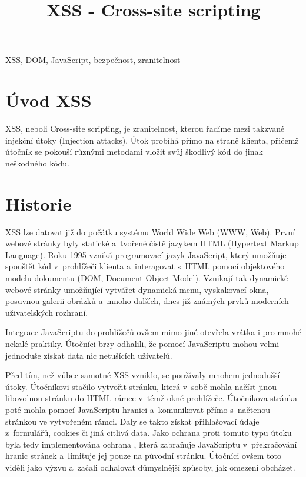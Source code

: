 \documentclass[11pt,conference, a4paper]{IEEEtran}
\begin{document}
\title{XSS \-- Cross\--site scripting}

\author{
}
\maketitle

\begin{abstract}

\end{abstract}

\begin{IEEEkeywords}
XSS, DOM, JavaScript, bezpečnost, zranitelnost
\end{IEEEkeywords}

\section{Úvod XSS}
XSS, neboli Cross-site scripting, je zranitelnost, kterou řadíme mezi takzvané injekční útoky (Injection attacks). Útok probíhá přímo na straně klienta, přičemž útočník se pokouší různými metodami vložit svůj škodlivý kód do jinak neškodného kódu.



\section{Historie}
XSS lze datovat již do počátku systému World Wide Web (WWW, Web). První webové stránky byly statické a~tvořené čistě jazykem HTML (Hypertext Markup Language). Roku 1995 vzniká programovací jazyk JavaScript, který umožňuje spouštět kód v~prohlížeči klienta a~interagovat s~HTML pomocí objektového modelu dokumentu (DOM,  Document Object Model). Vznikají tak dynamické webové stránky umožňující vytvářet dynamická menu, vyskakovací okna, posuvnou galerii obrázků a~mnoho dalších, dnes již známých prvků moderních uživatelských rozhraní. 

Integrace JavaScriptu do prohlížečů ovšem mimo jiné otevřela vrátka i pro mnohé nekalé praktiky. Útočníci brzy odhalili, že pomocí JavaScriptu mohou velmi jednoduše získat data nic netušících uživatelů. 

Před tím, než vůbec samotné XSS vzniklo, se používaly mnohem jednodušší útoky. Útočníkovi stačilo vytvořit stránku, která v~sobě mohla načíst jinou libovolnou stránku do HTML rámce v~témž okně prohlížeče. Útočníkova stránka poté mohla pomocí JavaScriptu  hranici a~komunikovat přímo s~načtenou stránkou ve vytvořeném rámci. Daly se takto získat přihlašovací údaje z~formulářů, cookies či jiná citlivá data. Jako ochrana proti tomuto typu útoku byla tedy implementována ochrana , která zabraňuje JavaScriptu v~překračování hranic stránek a~limituje jej pouze na původní stránku. Útočníci ovšem toto viděli jako výzvu a~začali odhalovat důmyslnější způsoby, jak omezení obcházet.
\end{document}
